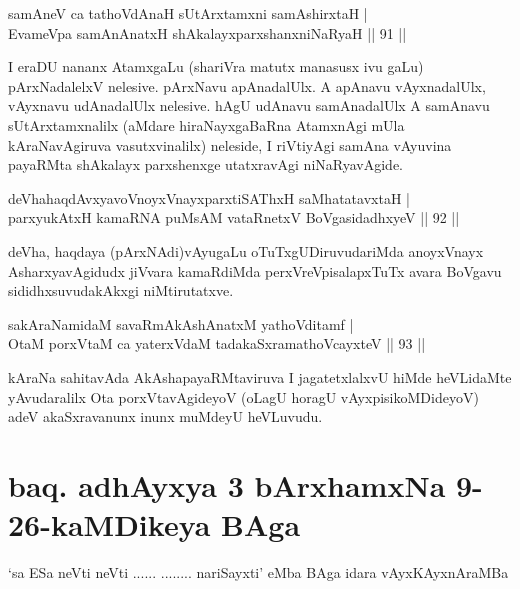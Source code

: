 \begin{shl}
samAneV ca tathoVdAnaH sUtArxtamxni samAshirxtaH |\\
EvameVpa samAnAnatxH shAkalayxparxshanxniNaRyaH \hfill || 91 ||
\end{shl}

\begin{artha}
I eraDU nananx AtamxgaLu (shariVra matutx manasusx ivu gaLu) pArxNadalelxV nelesive. pArxNavu apAnadalUlx. A apAnavu vAyxnadalUlx, vAyxnavu udAnadalUlx nelesive. hAgU udAnavu samAnadalUlx A samAnavu sUtArxtamxnalilx (aMdare hiraNayxgaBaRna AtamxnAgi mUla kAraNavAgiruva vasutxvinalilx) neleside, I riVtiyAgi samAna vAyuvina payaRMta shAkalayx parxshenxge utatxravAgi niNaRyavAgide.
\end{artha}


\begin{shl}
deVhahaqdAvxyavoV\s noyxVnayxparxtiSAThxH saMhatatavxtaH |\\
parxyukAtxH kamaRNA puMsAM vataRnetxV BoVgasidadhxyeV \hfill || 92 ||
\end{shl}

\begin{artha}%
deVha, haqdaya (pArxNAdi)vAyugaLu oTuTxgUDiruvudariMda anoyxVnayx AsharxyavAgidudx jiVvara kamaRdiMda perxVreVpisalapxTuTx avara BoVgavu sididhxsuvudakAkxgi niMtirutatxve.
\end{artha}

\begin{shl}
sakAraNamidaM savaRmAkAshAnatxM yathoVditamf |\\
OtaM porxVtaM ca yaterxVdaM tadakaSxramathoVcayxteV \hfill || 93 ||
\end{shl}

\begin{artha}
kAraNa sahitavAda AkAshapayaRMtaviruva I jagatetxlalxvU hiMde heVLidaMte yAvudaralilx Ota porxVtavAgideyoV (oLagU horagU vAyxpisikoMDideyoV) adeV akaSxravanunx inunx muMdeyU heVLuvudu.
\end{artha}

\section*{baq. adhAyxya 3 \ndash  bArxhamxNa 9-26-kaMDikeya BAga}

\begin{shl}
`sa ESa neVti neVti ...... ........ nariSayxti' eMba BAga idara vAyxKAyxnAraMBa
\end{shl}

